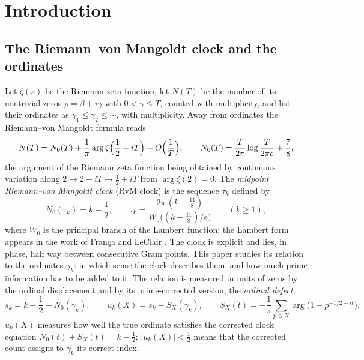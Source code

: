 \documentclass[preprint,12pt]{elsarticle}
\numberwithin{equation}{section}
\theoremstyle{plain}
\theoremstyle{definition}
\theoremstyle{remark}
\newcommand{\NO}{N_0}
\begin{document}
\tableofcontents

\section{Introduction}
\label{sec:introduction}

\subsection{The Riemann--von Mangoldt clock and the ordinates}
\label{subsec:clock_intro}
Let $\zeta(s)$ be the Riemann zeta function, let $N(T)$ be the number of its nontrivial zeros $\rho=\beta+i\gamma$ with $0<\gamma\le T$, counted with multiplicity, and list their ordinates as $\gamma_1\le\gamma_2\le\cdots$, with multiplicity. Away from ordinates the Riemann--von Mangoldt formula reads \cite[\S\S9.3--9.4]{Titchmarsh1986}
\begin{equation}
 N(T)=\NO(T)+\frac1\pi\arg\zeta\Bigl(\frac12+iT\Bigr)+O\Bigl(\frac1T\Bigr),\qquad \NO(T)=\frac{T}{2\pi}\log\frac{T}{2\pi e}+\frac78,
 \label{eq:intro_rvm}
\end{equation}
the argument of the Riemann zeta function being obtained by continuous variation along $2\to2+iT\to\frac12+iT$ from $\arg\zeta(2)=0$. The \emph{midpoint Riemann--von Mangoldt clock} (RvM clock) is the sequence $\tau_k$ defined by
\begin{equation}
 \NO(\tau_k)=k-\frac12,\qquad \tau_k=\frac{2\pi\,(k-\frac{11}8)}{W_0\bigl((k-\frac{11}8)/e\bigr)}\qquad(k\ge1),
 \label{eq:intro_clock}
\end{equation}
where $W_0$ is the principal branch of the Lambert function; the Lambert form appears in the work of Fran\c{c}a and LeClair \cite{FrancaLeClair2014,FrancaLeClair2015}. The clock is explicit and lies, in phase, half way between consecutive Gram points. This paper studies its relation to the ordinates $\gamma_k$: in which sense the clock describes them, and how much prime information has to be added to it. The relation is measured in units of zeros by the ordinal displacement and by its prime-corrected version, the \emph{ordinal defect},
\begin{equation}
 s_k=k-\frac12-\NO(\gamma_k),\qquad u_k(X)=s_k-S_X(\gamma_k),\qquad S_X(t)=-\frac1\pi\sum_{p\le X}\arg\bigl(1-p^{-1/2-it}\bigr).
 \label{eq:intro_defect}
\end{equation}
$u_k(X)$ measures how well the true ordinate satisfies the corrected clock equation $\NO(t)+S_X(t)=k-\frac12$; $|u_k(X)|<\frac12$ means that the corrected count assigns to $\gamma_k$ its correct index.
\end{document}
